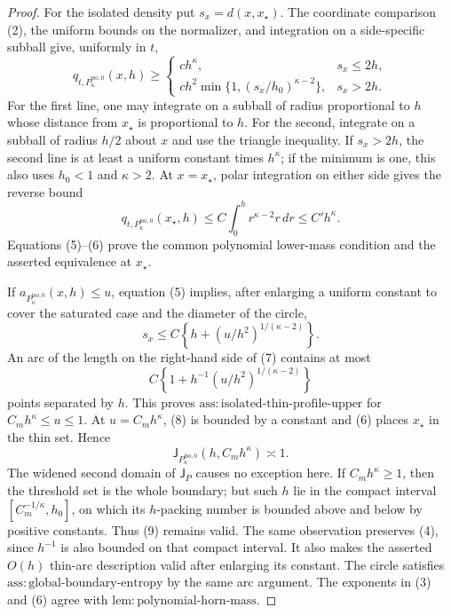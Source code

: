 \documentclass{article}
\begin{document}
\begin{proof}
For the isolated density put \(s_x=d(x,x_{\star})\).  The coordinate
comparison (2), the uniform bounds on the normalizer, and integration on
a side-specific subball give, uniformly in \(t\),
\[
 q_{t,P_{\kappa}^{\mathrm{iso},0}}(x,h)\ge
 \begin{cases}
 c h^{\kappa},&s_x\le2h,\\
 c h^2\min\{1,(s_x/h_0)^{\kappa-2}\},&s_x>2h.
 \end{cases}
 \tag{5}
\]
For the first line, one may integrate on a subball of radius proportional
to \(h\) whose distance from \(x_{\star}\) is proportional to \(h\).
For the second, integrate on a subball of radius \(h/2\) about \(x\) and
use the triangle inequality.  If \(s_x>2h\), the second line is at least
a uniform constant times \(h^{\kappa}\); if the minimum is one, this also
uses \(h_0<1\) and \(\kappa>2\).  At \(x=x_{\star}\), polar integration
on either side gives the reverse bound
\[
 q_{t,P_{\kappa}^{\mathrm{iso},0}}(x_{\star},h)
 \le C\int_0^h r^{\kappa-2}r\,dr
 \le C'h^{\kappa}.
 \tag{6}
\]
Equations (5)--(6) prove the common polynomial lower-mass condition and
the asserted equivalence at \(x_{\star}\).

If \(a_{P_{\kappa}^{\mathrm{iso},0}}(x,h)\le u\), equation (5) implies,
after enlarging a uniform constant to cover the saturated case and the
diameter of the circle,
\[
 s_x\le C\left\{h+(u/h^2)^{1/(\kappa-2)}\right\}.
 \tag{7}
\]
An arc of the length on the right-hand side of (7) contains at most
\[
 C\left\{1+h^{-1}(u/h^2)^{1/(\kappa-2)}\right\}
 \tag{8}
\]
points separated by \(h\).  This proves
\(\mathrm{ass:isolated\text{-}thin\text{-}profile\text{-}upper}\) for
\(C_mh^{\kappa}\le u\le1\).  At \(u=C_mh^{\kappa}\), (8) is bounded by
a constant and (6) places \(x_{\star}\) in the thin set.  Hence
\[
 \mathsf J_{P_{\kappa}^{\mathrm{iso},0}}
       (h,C_mh^{\kappa})\asymp1.
 \tag{9}
\]
The widened second domain of \(\mathsf J_P\) causes no exception here.
If \(C_mh^{\kappa}\ge1\), then the threshold set is the whole boundary;
but such \(h\) lie in the compact interval
\([C_m^{-1/\kappa},h_0]\), on which its \(h\)-packing number is bounded
above and below by positive constants.  Thus (9) remains valid.  The
same observation preserves (4), since \(h^{-1}\) is also bounded on that
compact interval.  It also makes the asserted \(O(h)\) thin-arc
description valid after enlarging its constant.  The circle satisfies
\(\mathrm{ass:global\text{-}boundary\text{-}entropy}\) by the same arc
argument.  The exponents in (3) and (6) agree with
\(\mathrm{lem:polynomial\text{-}horn\text{-}mass}\).


\end{proof}
\end{document}
